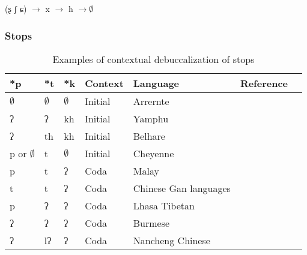 \documentclass[oldfontcommands,oneside,a4paper,11pt]{article}
\newcommand{\ipa}[1]{{\phon \mbox{#1}}} %
\newcommand{\grise}[1]{\cellcolor{lightgray}\textbf{#1}}
\begin{document}
(ʂ ʃ ɕ) $\rightarrow$  x $\rightarrow$ h $\rightarrow \emptyset$ 
 \subsubsection{Stops}
 
\begin{table}[h]
\caption{Examples of contextual debuccalization of stops} \label{tab:debucc.context}
\begin{tabular}{lllllll}
\toprule
*p & *t & *k & Context & Language    & Reference \\
\midrule
$\emptyset$ \grise{}&$\emptyset$ \grise{}& $\emptyset$ \grise{}&Initial& Arrernte &\citet{koch04arandic}\\
\ipa{ʔ} \grise{}&\ipa{ʔ} \grise{}& \ipa{kh} &Initial& Yamphu  & \citet[12-3]{opgenort05jero}\\
\ipa{ʔ} \grise{}&\ipa{th} & \ipa{kh} & Initial&Belhare   & \\
\ipa{p} or $\emptyset$ &\ipa{t}  & $\emptyset$ \grise{}&Initial& Cheyenne &\citet{goddard88cheyenne.y}\\
\midrule
\ipa{p} &\ipa{t} & \ipa{ʔ}\grise{} & Coda &Malay   &   \\
\ipa{t} &\ipa{t} & \ipa{ʔ}\grise{} & Coda &Chinese Gan languages  &  \citet[123]{chinese.atlas08}  \\
\ipa{p} &\ipa{ʔ} \grise{}& \ipa{ʔ}\grise{} & Coda&Lhasa Tibetan   & \\
\ipa{ʔ} \grise{}&\ipa{ʔ} \grise{}& \ipa{ʔ}\grise{} & Coda& Burmese  & \\
\ipa{ʔ} \grise{}&\ipa{lʔ}& \ipa{ʔ}\grise{} & Coda& Nancheng Chinese& \citet[123]{chinese.atlas08}\\
\bottomrule
\end{tabular}
\end{table}

 
 
\end{document}
